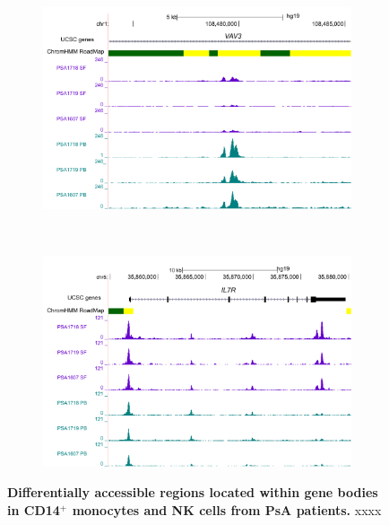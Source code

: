 \bigskip
\begin{figure}[H]
\centering
\begin{subfigure}[b]{0.70\textwidth}
\centering 
\includegraphics[width=\textwidth]{./Results3/pdfs/ATAC_PSA_NK_VAV3}
\caption{}
\end{subfigure}
~
\begin{subfigure}[b]{0.70\textwidth} 
\centering
\includegraphics[width=\textwidth]{./Results3/pdfs/ATAC_PSA_CD14_IL7R}
\caption{}
\end{subfigure}
\caption[Differentially accessible regions located within gene bodies in CD14$^+$ monocytes and NK cells from PsA patients.]{\textbf{Differentially accessible regions located within gene bodies in CD14$^+$ monocytes and NK cells from PsA patients.} xxxx}
\label{figure:PsA_FAST_ATAC_gene_boy_DOCS_CD14_NK}
\end{figure}


